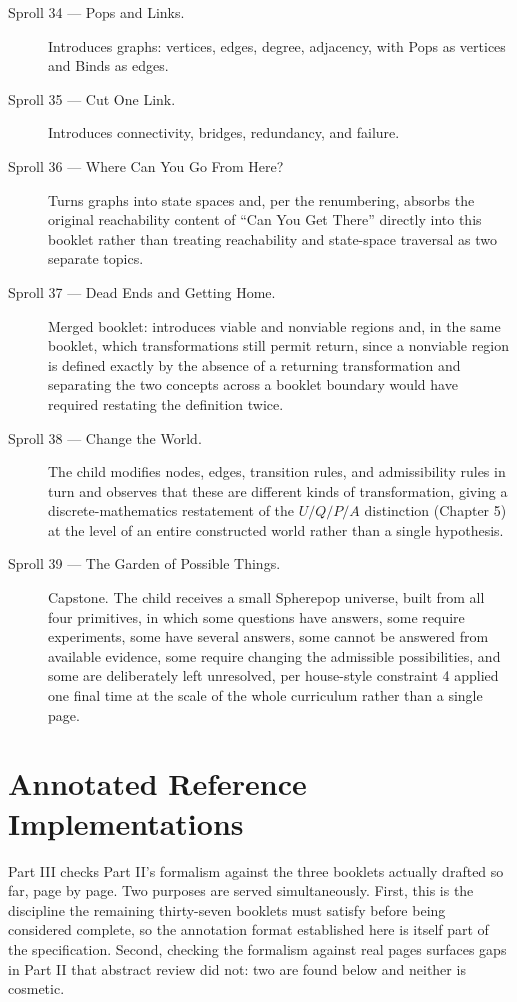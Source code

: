 \documentclass[11pt,twoside]{book}
\begin{document}
\begin{description}
\item[Sproll 34 --- Pops and Links.] Introduces graphs: vertices, edges, degree, adjacency, with Pops as vertices and Binds as edges.
\item[Sproll 35 --- Cut One Link.] Introduces connectivity, bridges, redundancy, and failure.
\item[Sproll 36 --- Where Can You Go From Here?] Turns graphs into state spaces and, per the renumbering, absorbs the original reachability content of ``Can You Get There'' directly into this booklet rather than treating reachability and state-space traversal as two separate topics.
\item[Sproll 37 --- Dead Ends and Getting Home.] Merged booklet: introduces viable and nonviable regions and, in the same booklet, which transformations still permit return, since a nonviable region is defined exactly by the absence of a returning transformation and separating the two concepts across a booklet boundary would have required restating the definition twice.
\item[Sproll 38 --- Change the World.] The child modifies nodes, edges, transition rules, and admissibility rules in turn and observes that these are different kinds of transformation, giving a discrete-mathematics restatement of the $U/Q/P/A$ distinction (Chapter 5) at the level of an entire constructed world rather than a single hypothesis.
\item[Sproll 39 --- The Garden of Possible Things.] Capstone. The child receives a small Spherepop universe, built from all four primitives, in which some questions have answers, some require experiments, some have several answers, some cannot be answered from available evidence, some require changing the admissible possibilities, and some are deliberately left unresolved, per house-style constraint 4 applied one final time at the scale of the whole curriculum rather than a single page.
\end{description}

\part{Annotated Reference Implementations}

Part III checks Part II's formalism against the three booklets actually drafted so far, page by page. Two purposes are served simultaneously. First, this is the discipline the remaining thirty-seven booklets must satisfy before being considered complete, so the annotation format established here is itself part of the specification. Second, checking the formalism against real pages surfaces gaps in Part II that abstract review did not: two are found below and neither is cosmetic.
\end{document}
